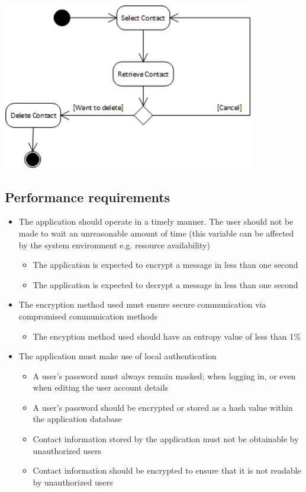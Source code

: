 \begin{itemize}
 \includegraphics[width=11cm]{diagrams/StateDiagrams/RemoveContactStateDiagram.png}
\end{itemize}

\subsection{Performance requirements}
\begin{itemize}
\item The application should operate in a timely manner. The user should not be made to wait an unreasonable amount of time (this variable can be affected by the system environment e.g. resource availability)
\begin{itemize}
\item The application is expected to encrypt a message in less than one second
\item The application is expected to decrypt a message in less than one second
\end{itemize}
\item The encryption method used must ensure secure communication via compromised communication methods
\begin{itemize}
\item The encyption method used should have an entropy value of less than 1\%
\end{itemize}
\item The application must make use of local authentication
\begin{itemize}
\item A user's password must always remain masked; when logging in, or even when editing the user account details
\item A user's password should be encrypted or stored as a hash value within the application database
\item Contact information stored by the application must not be obtainable by unauthorized users
\item Contact information should be encrypted to ensure that it is not readable by unauthorized users
\end{itemize}
\end{itemize}

